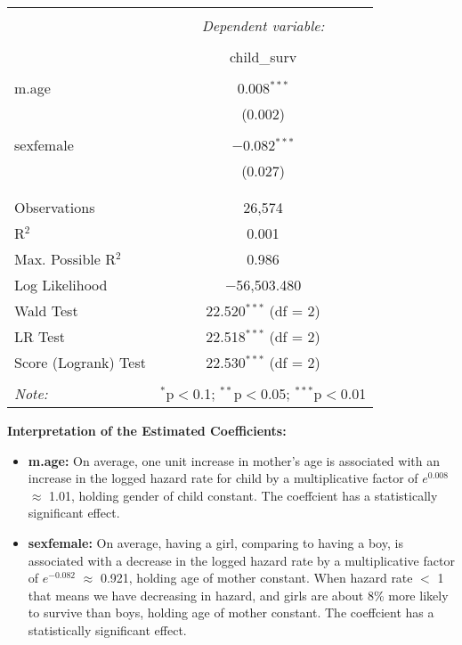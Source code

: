 \documentclass[12pt,letterpaper]{article}
\begin{document}
\begin{table}[!htbp] \centering   \caption{}   \label{} \begin{tabular}{@{\extracolsep{5pt}}lc} \\[-1.8ex]\hline \hline \\[-1.8ex]  & \multicolumn{1}{c}{\textit{Dependent variable:}} \\ \cline{2-2} \\[-1.8ex] & child\_surv \\ \hline \\[-1.8ex]  m.age & 0.008$^{***}$ \\   & (0.002) \\   & \\  sexfemale & $-$0.082$^{***}$ \\   & (0.027) \\   & \\ \hline \\[-1.8ex] Observations & 26,574 \\ R$^{2}$ & 0.001 \\ Max. Possible R$^{2}$ & 0.986 \\ Log Likelihood & $-$56,503.480 \\ Wald Test & 22.520$^{***}$ (df = 2) \\ LR Test & 22.518$^{***}$ (df = 2) \\ Score (Logrank) Test & 22.530$^{***}$ (df = 2) \\ \hline \hline \\[-1.8ex] \textit{Note:}  & \multicolumn{1}{r}{$^{*}$p$<$0.1; $^{**}$p$<$0.05; $^{***}$p$<$0.01} \\ \end{tabular} \end{table} 


\vspace{1cm}


	\textbf{Interpretation of the Estimated Coefficients:}

\begin{itemize}
	
	\item \textbf{m.age:} On average, one unit increase in mother's age is associated with an increase in the logged hazard rate for child by a multiplicative factor of \(e^{0.008}\) $\approx $ 1.01, holding gender of child constant. The coeffcient has a statistically significant effect.
	\item \textbf{sexfemale:} On average, having a girl, comparing to having a boy, is associated with a decrease in the logged hazard rate by a multiplicative factor of \(e^{-0.082}\) $\approx$ 0.921, holding age of mother constant. When hazard rate $<$ 1 that means we have decreasing in hazard, and girls are about 8\% more likely to survive than boys, holding age of mother constant. The coeffcient has a statistically significant effect.
\end{itemize}
\end{document}
